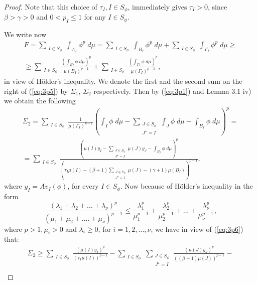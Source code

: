 \documentclass[10pt,a4paper]{amsart}
\begin{document}
\begin{proof}
Note that this choice of $\tau_I, I\in S_{\phi}$, immediately gives $\tau_I>0$, since $\beta>\gamma>0$ and $0<p_I\leq 1$ for any $I\in S_{\phi}$.

We write now
\begin{multline} \label{eq:3p5}
F=\sum_{\substack{I\in S_\phi}} \int_{A_I}\phi^p\; d\mu= \sum_{\substack{I\in S_\phi}} \int_{B_I}\phi^p\; d\mu+ \sum_{\substack{I\in S_\phi}} \int_{\Gamma_I} \phi^p \; d\mu \geq \\
\geq \sum_{\substack{I\in S_\phi}} \frac{\left(\int_{B_I}\phi\; d\mu\right)^p}{\mu(B_I)^{p-1}}+\sum_{\substack{I\in S_\phi}} \frac{\left(\int_{\Gamma_I}\phi\; d\mu\right)^p}{\mu(\Gamma_I)^{p-1}},
\end{multline}
in view of H{\"o}lder's inequality. We denote the first and the second sum on the right of (\ref{eq:3p5}) by $\Sigma_1$, $\Sigma_2$ respectively.
Then by (\ref{eq:3p1}) and Lemma 3.1 iv) we obtain the following
\begin{multline} \label{eq:3p6}
\Sigma_2= \sum_{\substack{I\in S_\phi}}\frac{1}{\mu(\Gamma_I)^{p-1}}\left( \int_I \phi\; d\mu - \sum_{\substack{J\in S_\phi \\ J^\star=I\ }} \int_J \phi \; d\mu - \int_{B_I}\phi\;d\mu \right)^p=\\
=\sum_{\substack{I\in S_\phi}} \frac{\left( \mu(I)y_I-\sum_{\substack{J\in S_\phi \\ J^\star=I }} \mu(J)y_J-\int_{B_I}\phi\; d\mu \right)^p}{\left( \tau_I \mu(I)-(\beta +1)\sum_{\substack{J\in S_\phi \\ J^\star=I }}\mu(J)-(\gamma+1)\mu(B_I)\right)^{p-1}},
\end{multline}
where $y_I=Av_{I}(\phi)$, for every $I\in S_{\phi}$.
Now because of H{\"o}lder's inequality in the form
\begin{equation} \label{eq:3p7}
\frac{\left(\lambda_1+\lambda_2+...+\lambda_{\nu} \right)^p}{\left( \mu_1+\mu_2+....+\mu_{\nu} \right)^{p-1}}\leq \frac{\lambda_1^p}{\mu_1^{p-1}}+\frac{\lambda_2^p}{\mu_2^{p-1}}+...+ \frac{\lambda_{\nu}^p}{\mu_{\nu}^{p-1}},
\end{equation}
where $p>1,\mu_i>0$ and $\lambda_i\geq 0$, for $i=1,2,...,\nu$, we have in view of (\ref{eq:3p6}) that:
\begin{multline} \label{eq:3p8}
\Sigma_2\geq \sum_{\substack{I\in S_\phi}}\frac{\left( \mu(I)y_I \right)^p}{\left( \tau_I \mu(I) \right)^{p-1}}- \sum_{\substack{I\in S_\phi}}\sum_{\substack{J\in S_\phi \\ J^\star=I\ }}\frac{\left( \mu(J)y_J \right)^p}{\left( (\beta +1)\mu(J) \right)^{p-1}}-\\

\end{multline}
\end{proof}
\end{document}
